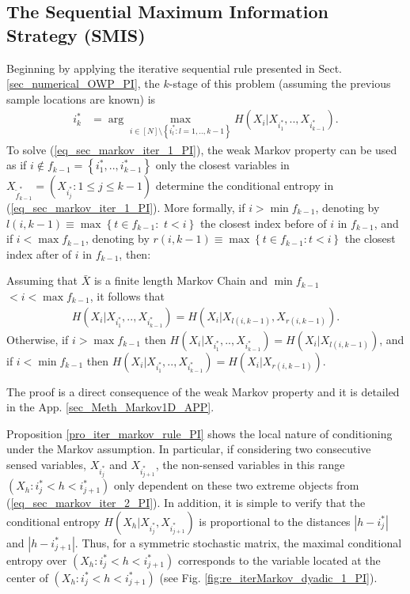 \subsection{The Sequential  Maximum Information Strategy (SMIS)}
\label{sec_markov_iter_PI}
Beginning by applying the iterative sequential rule presented in Sect. \ref{sec_numerical_OWP_PI}, the $k$-stage  of this problem (assuming the previous sample locations are known) is
\begin{align}\label{eq_sec_markov_iter_1_PI}
	i^*_k &= \arg \max_{i \in [N] \setminus \left\{i^*_l: l=1,..,k-1\right\}} H(X_{i}|X_{i^*_1},..,X_{i^*_{k-1}}).
\end{align}
To solve (\ref{eq_sec_markov_iter_1_PI}), { the weak Markov property} \citep{norris_1997} can be used as if  $i \notin {f}_{k-1}=\left\{i^*_1,..,i^*_{k-1} \right\}$  only the closest variables in $X_{\tilde{f}^*_{k-1}}=( X_{i^*_j} : 1 \leq j \leq k-1 )$ determine the conditional entropy in (\ref{eq_sec_markov_iter_1_PI}). More formally,  if $i > \min {f}_{k-1}$, denoting by  $l(i,{k-1}) \equiv \max \left\{ t\in {f}_{k-1}: \right. $ $ \left. t <i \right\}$ the closest index before of $i$ in ${f}_{k-1}$,  and if $i < \max {f}_{k-1}$, denoting by $r(i,k-1)\equiv \max \left\{ t\in {f}_{k-1}: t <i \right\}$ the closest index after of $i$ in ${f}_{k-1}$, then: 
\begin{proposition}\label{pro_iter_markov_rule_PI}
	Assuming that $\bar{X}$ is a finite length Markov Chain and $\min {f}_{k-1} $ $ <i < \max {f}_{k-1}$, it follows that 
	\begin{align} \label{eq_sec_markov_iter_2_PI}
		H(X_{i}|X_{i^*_1},..,X_{i^*_{k-1}}) = H(X_{i}| X_{l(i,{k-1})}, X_{r(i,{k-1})}).
	\end{align}
	Otherwise,  if $i > \max {f}_{k-1}$ then $H(X_{i}|X_{i^*_1},..,X_{i^*_{k-1}}) = H(X_{i}| X_{l(i,{k-1})})$, 
	and if $i < \min {f}_{k-1}$ then $H(X_{i}|X_{i^*_1},..,X_{i^*_{k-1}}) = H(X_{i}|X_{r(i,{k-1})})$.  
\end{proposition}
{The proof is a direct consequence of the weak Markov property and it is detailed in the App. \ref{sec_Meth_Markov1D_APP}. }

Proposition \ref{pro_iter_markov_rule_PI} shows the local nature of conditioning under the Markov assumption. In particular, if considering two consecutive sensed variables, $X_{i^*_j}$ and $X_{i^*_{j+1}}$, the non-sensed variables in this range $(X_{h} : i^*_j  < h < i^*_{j+1})$ only dependent on these two extreme objects from (\ref{eq_sec_markov_iter_2_PI}). In addition, it is simple to verify that the conditional entropy $H(X_{h} | X_{i^*_j} , X_{i^*_{j+1}})$ is proportional to the distances $|h-  i^*_j|$ and $|h- i^*_{j+1}|$. Thus, for a symmetric stochastic matrix, the maximal conditional entropy over $(X_{h} : i^*_j  < h < i^*_{j+1})$ corresponds to the variable located at the center of $(X_{h} : i^*_j  < h < i^*_{j+1})$ (see Fig. \ref{fig:re_iterMarkov_dyadic_1_PI}).  

